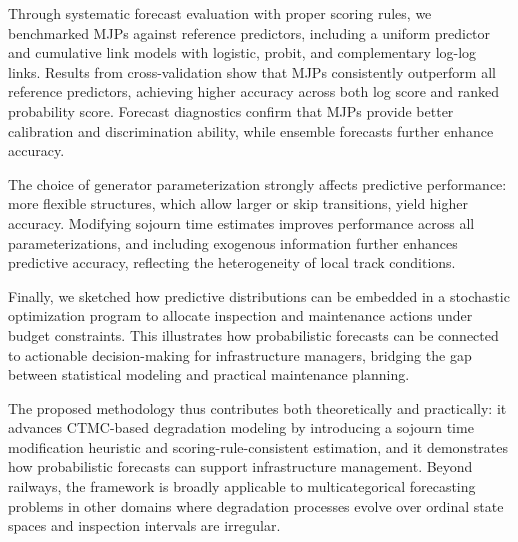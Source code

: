 Through systematic forecast evaluation with proper scoring rules, we benchmarked MJPs against reference predictors, including a uniform predictor and cumulative link models with logistic, probit, and complementary log-log links. Results from cross-validation show that MJPs consistently outperform all reference predictors, achieving higher accuracy across both log score and ranked probability score. Forecast diagnostics confirm that MJPs provide better calibration and discrimination ability, while ensemble forecasts further enhance accuracy.

The choice of generator parameterization strongly affects predictive performance: more flexible structures, which allow larger or skip transitions, yield higher accuracy. Modifying sojourn time estimates improves performance across all parameterizations, and including exogenous information further enhances predictive accuracy, reflecting the heterogeneity of local track conditions.

Finally, we sketched how predictive distributions can be embedded in a stochastic optimization program to allocate inspection and maintenance actions under budget constraints. This illustrates how probabilistic forecasts can be connected to actionable decision-making for infrastructure managers, bridging the gap between statistical modeling and practical maintenance planning.

The proposed methodology thus contributes both theoretically and practically: it advances CTMC-based degradation modeling by introducing a sojourn time modification heuristic and scoring-rule-consistent estimation, and it demonstrates how probabilistic forecasts can support infrastructure management. Beyond railways, the framework is broadly applicable to multicategorical forecasting problems in other domains where degradation processes evolve over ordinal state spaces and inspection intervals are irregular.


